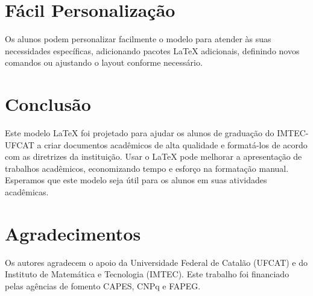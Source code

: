 \documentclass[
	article,			%
	11pt,				%
	oneside,			%
	a4paper,			%
	chapter=TITLE,
	english,			%
	brazil,				%
	sumario=tradicional
	]{templateimtec}
\begin{document}
\section{Fácil Personalização}

Os alunos podem personalizar facilmente o modelo para atender às suas necessidades específicas, adicionando pacotes LaTeX adicionais, definindo novos comandos ou ajustando o layout conforme necessário.

\section{Conclusão}

Este modelo LaTeX foi projetado para ajudar os alunos de graduação do IMTEC-UFCAT a criar documentos acadêmicos de alta qualidade e formatá-los de acordo com as diretrizes da instituição. Usar o LaTeX pode melhorar a apresentação de trabalhos acadêmicos, economizando tempo e esforço na formatação manual. Esperamos que este modelo seja útil para os alunos em suas atividades acadêmicas.



\section*{Agradecimentos}
Os autores agradecem o apoio da Universidade Federal de Catalão (UFCAT) e do Instituto de Matemática e Tecnologia (IMTEC). Este trabalho foi financiado pelas agências de fomento CAPES, CNPq e FAPEG.

\end{document}
